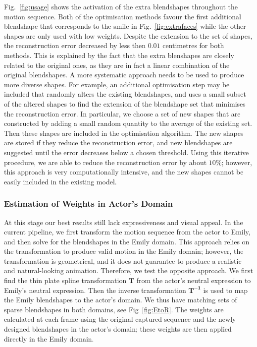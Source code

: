 Fig.~\ref{fig:usage} shows the activation of the extra blendshapes throughout the motion sequence. Both of the optimisation methods favour the first additional blendshape that corresponds to the smile in Fig.~\ref{fig:extrafaces} while the other shapes are only used with low weights. Despite the extension to the set of shapes, the reconstruction error decreased by less then $0.01$ centimetres for both methods. This is explained by the fact that the extra blenshapes are closely related to the original ones, as they are in fact a linear combination of the original blendshapes. A more systematic approach needs to be used to produce more diverse shapes. For example, an additional optimisation step may be included that randomly alters the existing blendshapes, and uses a small subset of the altered shapes to find the extension of the blendshape set that minimises the reconstruction error. In particular, we choose a set of new shapes that are constructed by adding a small random quantity to the average of the existing set. Then these shapes are included in the optimisation algorithm. The new shapes are stored if they reduce the reconstruction error, and new blendshapes are suggested until the error decreases below a chosen threshold. Using this iterative procedure, we are able to reduce the reconstruction error by about $10 \%$; however, this approach is very computationally intensive, and the new shapes cannot be easily included in the existing model. 

\subsubsection{Estimation of Weights in Actor's Domain}

At this stage our best results still lack expressiveness and visual appeal. In the current pipeline, we first transform the motion sequence from the actor to Emily, and then solve for the blendshapes in the Emily domain. This approach relies on the transformation to produce valid motion in the Emily domain; however, the transformation is geometrical, and it does not guarantee to produce a realistic and natural-looking animation. Therefore, we test the opposite approach. We first find the thin plate spline transformation $\mathbf{T}$ from the actor's neutral expression to Emily's neutral expression. Then the inverse transformation $\mathbf{T^{-1}}$ is used to map the Emily blendshapes to the actor's domain. We thus have matching sets of sparse blendshapes in both domains, see Fig~\ref{fig:EtoR}. The weights are calculated at each frame using the original captured sequence and the newly designed blendshapes in the actor's domain; these weights are then applied directly in the Emily domain. 


